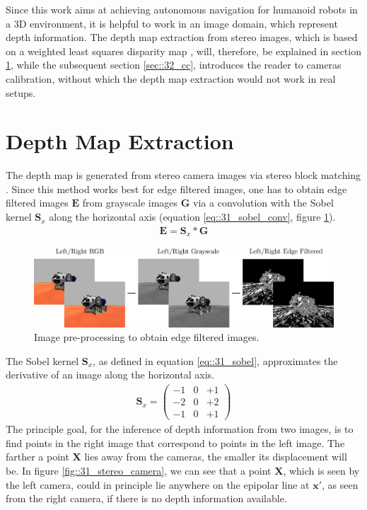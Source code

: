 \FloatBarrier
\label{sec::3_ip}
Since this work aims at achieving autonomous navigation for humanoid robots in a 3D environment, it is helpful to work in an image domain, which represent depth information. The depth map extraction from stereo images, which is based on a weighted least squares disparity map \cite{min2014fast}, will, therefore, be explained in section \ref{sec::31_dm}, while the subsequent section \ref{sec::32_cc}, introduces the reader to cameras calibration, without which the depth map extraction would not work in real setups.
\FloatBarrier
\section{Depth Map Extraction}
\label{sec::31_dm}
The depth map is generated from stereo camera images via stereo block matching \cite{hamzah2010sum}. Since this method works best for edge filtered images, one has to obtain edge filtered images $\bm{E}$ from grayscale images $\bm{G}$ via a convolution with the Sobel kernel $\bm{S}_x$ along the horizontal axis \cite{sobel2014an} (equation \ref{eq::31_sobel_conv}, figure \ref{fig::31_image_preprocessing}). 
\begin{align}
	\bm{E} = \bm{S}_x*\bm{G}
	\label{eq::31_sobel_conv}
\end{align}
\begin{figure}[h!]
	\centering
	\includegraphics[scale=.28]{chapters/03_fundamentals_of_image_processing/img/image_preprocessing.png}
	\caption{Image pre-processing to obtain edge filtered images.}
	\label{fig::31_image_preprocessing}
\end{figure}
The Sobel kernel $\bm{S}_x$, as defined in equation \ref{eq::31_sobel}, approximates the derivative of an image along the horizontal axis.
\begin{align}
	\bm{S}_x=
	\begin{pmatrix}
		-1 & 0 & +1 \\
		-2 & 0 & +2 \\
		-1 & 0 & +1
	\end{pmatrix}
	\label{eq::31_sobel}
\end{align}
The principle goal, for the inference of depth information from two images, is to find points in the right image that correspond to points in the left image. The farther a point $\bm{X}$ lies away from the cameras, the smaller its displacement will be. In figure \ref{fig::31_stereo_camera}, we can see that a point $\bm{X}$, which is seen by the left camera, could in principle lie anywhere on the epipolar line at $\bm{x}'$, as seen from the right camera, if there is no depth information available. 
